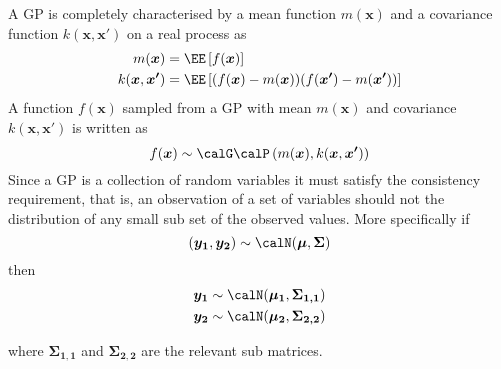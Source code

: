 A GP is completely characterised by a mean function $m(\bm{x})$ and a covariance function $k (\bm{x}, \bm{x'})$ on a real process as
\begin{align*}
	m(\bm{x})           & = \EE \left[ f(\bm{x}) \right]                                         \\
	k (\bm{x}, \bm{x'}) & = \EE \left[ (f(\bm{x}) - m(\bm{x})) (f(\bm{x'}) - m(\bm{x'})) \right]
\end{align*}
A function $f(\bm{x})$ sampled from a GP with mean $m(\bm{x})$ and covariance $k (\bm{x}, \bm{x'})$ is written as
\[
	f(\bm{x}) \sim \calG \calP \left( m(\bm{x}), k (\bm{x}, \bm{x'}) \right)
\]
Since a GP is a collection of random variables it must satisfy the consistency requirement, that is, an observation of a set of variables should not the distribution of any small sub set of the observed values. More specifically if
\[
	(\bm{y_1}, \bm{y_2}) \sim \calN (\bm{\mu}, \bm{\Sigma})
\]
then
\begin{align*}
	\bm{y_1} & \sim \calN (\bm{\mu_1}, \bm{\Sigma_{1,1}}) \\
	\bm{y_2} & \sim \calN (\bm{\mu_2}, \bm{\Sigma_{2,2}})
\end{align*}

where $\bm{\Sigma_{1,1}}$ and $\bm{\Sigma_{2,2}}$ are the relevant sub matrices.

